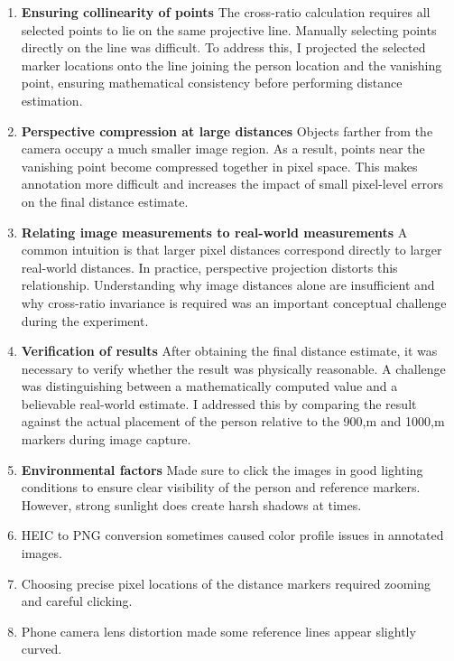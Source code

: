\begin{enumerate}
\begin{studentSpace}
\begin{enumerate}
        \item \textbf{Ensuring collinearity of points} The cross-ratio calculation requires all selected points to lie on the same projective line. Manually selecting points directly on the line was difficult. To address this, I projected the selected marker locations onto the line joining the person location and the vanishing point, ensuring mathematical consistency before performing distance estimation.
        \item \textbf{Perspective compression at large distances} Objects farther from the camera occupy a much smaller image region. As a result, points near the vanishing point become compressed together in pixel space. This makes annotation more difficult and increases the impact of small pixel-level errors on the final distance estimate.
        \item \textbf{Relating image measurements to real-world measurements} A common intuition is that larger pixel distances correspond directly to larger real-world distances. In practice, perspective projection distorts this relationship. Understanding why image distances alone are insufficient and why cross-ratio invariance is required was an important conceptual challenge during the experiment.
        \item \textbf{Verification of results} After obtaining the final distance estimate, it was necessary to verify whether the result was physically reasonable. A challenge was distinguishing between a mathematically computed value and a believable real-world estimate. I addressed this by comparing the result against the actual placement of the person relative to the 900,m and 1000,m markers during image capture.
        \item \textbf{Environmental factors} Made sure to click the images in good lighting conditions to ensure clear visibility of the person and reference markers. However, strong sunlight does create harsh shadows at times.
        \item HEIC to PNG conversion sometimes caused color profile issues in annotated images.
        \item Choosing precise pixel locations of the distance markers required zooming and careful clicking.
        \item Phone camera lens distortion made some reference lines appear slightly curved.
    \end{enumerate}
\end{studentSpace}



\end{enumerate}
